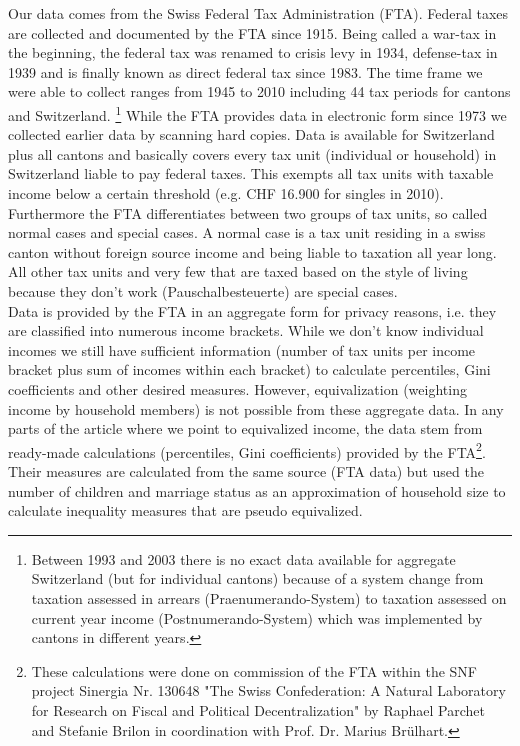 \documentclass[twoside]{article}\usepackage[]{graphicx}\usepackage[]{color}
\begin{document}
\begin{multicols}{2}
Our data comes from the Swiss Federal Tax Administration (FTA). Federal taxes are collected and documented by the FTA since 1915. Being called a war-tax in the beginning, the federal tax was renamed to crisis levy in 1934, defense-tax in 1939 and is finally known as direct federal tax since 1983. The time frame we were able to collect ranges from 1945 to 2010 including 44 tax periods for cantons and Switzerland. \footnote{Between 1993 and 2003 there is no exact data available for aggregate Switzerland (but for individual cantons) because of a system change from taxation assessed in arrears (Praenumerando-System) to taxation assessed on current year income (Postnumerando-System) which was implemented by cantons in different years.}  While the FTA provides data in electronic form since 1973 we collected earlier data by scanning hard copies. Data is available for Switzerland plus all cantons and basically covers every tax unit (individual or household) in Switzerland liable to pay federal taxes. This exempts all tax units with taxable income below a certain threshold (e.g. CHF 16.900 for singles in 2010). Furthermore the FTA differentiates between two groups of tax units, so called normal cases and special cases. A normal case is a tax unit residing in a swiss canton without foreign source income and being liable to taxation all year long. All other tax units and very few that are taxed based on the style of living because they don't work (Pauschalbesteuerte) are special cases. \\

Data is provided by the FTA in an aggregate form for privacy reasons, i.e. they are classified into numerous income brackets. While we don't know individual incomes we still have sufficient information (number of tax units per income bracket plus sum of incomes within each bracket) to calculate percentiles, Gini coefficients and other desired measures. However, equivalization (weighting income by household members) is not possible from these aggregate data. In any parts of the article where we point to equivalized income, the data stem from ready-made calculations (percentiles, Gini coefficients) provided by the FTA\footnote{These calculations were done on commission of the FTA within the SNF project Sinergia Nr. 130648 "The Swiss Confederation: A Natural Laboratory for Research on Fiscal and Political Decentralization" by Raphael Parchet and Stefanie Brilon in coordination with Prof. Dr. Marius Brülhart.}. Their measures are calculated from the same source (FTA data) but used the number of children and marriage status as an approximation of household size to calculate inequality measures that are pseudo equivalized. \\



\end{multicols}
\end{document}
